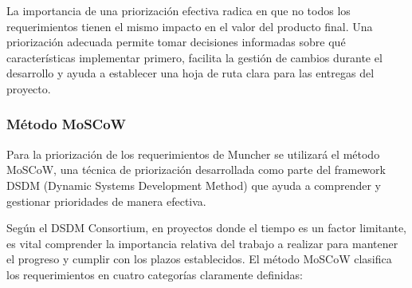 La importancia de una priorización efectiva radica en que no todos los requerimientos tienen el mismo impacto en el valor del producto final. Una priorización adecuada permite tomar decisiones informadas sobre qué características implementar primero, facilita la gestión de cambios durante el desarrollo y ayuda a establecer una hoja de ruta clara para las entregas del proyecto.

\subsubsection*{Método MoSCoW}

Para la priorización de los requerimientos de Muncher se utilizará el método MoSCoW, una técnica de priorización desarrollada como parte del framework DSDM (Dynamic Systems Development Method) \cite{DSDM2014} que ayuda a comprender y gestionar prioridades de manera efectiva.

Según el DSDM Consortium, en proyectos donde el tiempo es un factor limitante, es vital comprender la importancia relativa del trabajo a realizar para mantener el progreso y cumplir con los plazos establecidos. El método MoSCoW clasifica los requerimientos en cuatro categorías claramente definidas:

